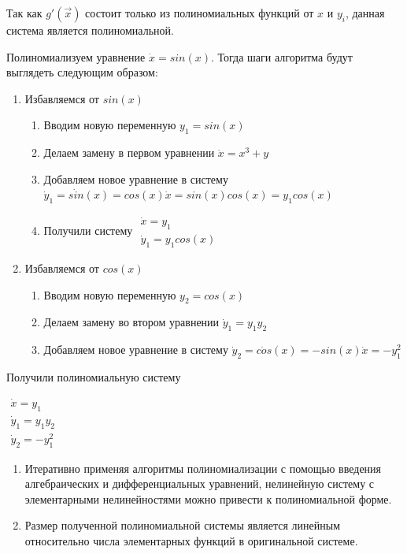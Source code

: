 Так как $g'(\vec x)$ состоит только из полиномиальных функций от $x$ и $y_i$, данная система является полиномиальной.

\begin{example}
    Полиномиализуем уравнение $\dot x = sin(x)$. Тогда шаги алгоритма будут выглядеть следующим образом:
    \begin{enumerate}
        \item Избавляемся от $sin(x)$
        \begin{enumerate}
            \item Вводим новую переменную $y_1 =  sin(x)$
            \item Делаем замену в первом уравнении $\dot x = x^3 + y$
            \item Добавляем новое уравнение в систему $\dot y_1 = \dot {sin}(x) = cos(x) \dot x = sin(x) cos(x) = y_1 cos(x)$
            \item Получили систему $\begin{array}{lcl} \dot x = y_1\\ \dot y_1 = y_1 cos(x) \end{array}$
        \end{enumerate}
        \item Избавляемся от $cos(x)$
        \begin{enumerate}
            \item Вводим новую переменную $y_2 =  cos(x)$
            \item Делаем замену во втором уравнении $\dot y_1 = y_1 y_2$
            \item Добавляем новое уравнение в систему $\dot y_2 = \dot {cos}(x) = -sin(x) \dot x = -y_1^2$
        \end{enumerate}
    \end{enumerate}
    
    Получили полиномиальную систему
    
    $\begin{array}{lcl}
        \dot x = y_1\\
        \dot y_1 = y_1 y_2\\
        \dot y_2 = -y_1^2
    \end{array}$
\end{example}



\begin{theorem}
    \begin{enumerate}
    \item Итеративно применяя алгоритмы полиномиализации с помощью введения алгебраических и дифференциальных уравнений, нелинейную систему с элементарными нелинейностями можно привести к полиномиальной форме.
    \item Размер полученной полиномиальной системы является линейным относительно числа элементарных функций в     оригинальной системе.
\end{enumerate}
\end{theorem}

